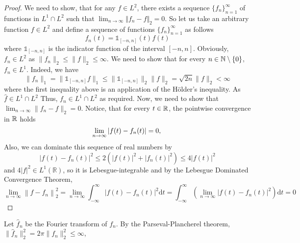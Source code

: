 \begin{proof}
    We need to show, that for any \(f \in L^2\), there exists a sequence \(\{f_n\}_{n=1}^{\infty}\) of functions
    in \(L^1 \cap L^2\) such that \(\lim_{n \to \infty} \Vert f_n - f \Vert_2 = 0\). So let us take an arbitrary
    function \(f \in L^2\) and define a sequence of functions \(\{f_n\}_{n=1}^{\infty}\) as follows
    \begin{equation*}
        f_n(t) = \mathbb{1}_{[-n,n]}(t)f(t)
    \end{equation*}
    where \(\mathbb{1}_{[-n,n]}\) is the indicator function of the interval \([-n,n]\). Obviously, \(f_n \in L^2\)
    as \(\lVert f_n \rVert_2 \leq \lVert f \rVert_2 \leq \infty \).  We need to show that for every
    \(n \in \mathbb{N}\setminus \left\{ 0 \right\}  \), \(f_n \in L^1\). Indeed, we have
    \begin{equation*}
        \lVert f_n \rVert_1 = \lVert \mathbb{1}_{[-n,n]}f \rVert_1 \leq \lVert \mathbb{1}_{[-n,n]} \rVert_2 \lVert f \rVert_2
        = \sqrt{2n} \lVert f \rVert_2 < \infty
    \end{equation*}
    where the first inequality above is an application of the Hölder's inequality. As \(\hat{f} \in L^1\cap L^2\)
    Thus, \(f_n \in L^1 \cap L^2\) as required. Now, we need to show that \(\lim_{n \to \infty} \lVert f_n - f \rVert_2 = 0\).
    Notice, that for every \(t\in\mathbb{R}\), the pointwise convergence in \(\mathbb{R}\)  holds
    \begin{equation*}
         \lim_{n \to  \infty} \vert  f(t)-f_n(t) \vert=0,                                           \\
    \end{equation*}
    Also, we can dominate this sequence of real numbers by
    \begin{equation*}
        \left|f(t)-f_n(t)\right|^2 \leq 2\left(|f(t)|^2+\left|f_n(t)\right|^2\right) \leq 4|f(t)|^2
    \end{equation*}
    and \(4|f|^2 \in L^1(\mathbb{R})\), so it is Lebesgue-integrable and by the Lebesgue Dominated Convergence Theorem,
    \begin{equation*}
        \lim_{n \to \infty}\left\|f-f_n\right\|_2^2=\lim_{n \to  \infty} \int_{-\infty}^{\infty}\left|f(t)-f_n(t)\right|^2 \mathrm{d}t =\int_{-\infty}^{\infty}\left(\lim_{n \to  \infty}\left|f(t)-f_n(t)\right|^2\right) \mathrm{d}t =0
    \end{equation*}
\end{proof}
Let \(\hat{f}_n\) be the Fourier transform of \(f_n\). By the Parseval-Plancherel theorem, \(\lVert \hat{f}_n \rVert_2^2 = 2\pi \lVert f_n \rVert_2^2 \leq \infty  \),
